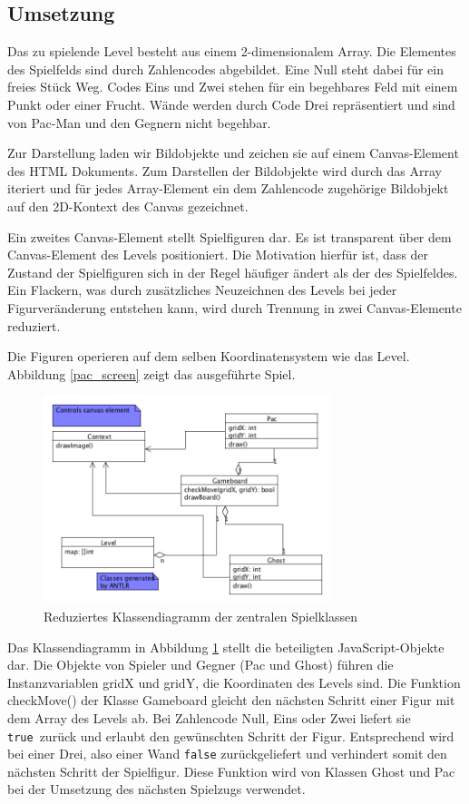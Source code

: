 \documentclass[conference]{IEEEtran}
\begin{document}
\subsection{Umsetzung}
\label{umsetz}
Das zu spielende Level besteht aus einem 2-dimensionalem Array. Die Elementes des Spielfelds sind durch Zahlencodes abgebildet. Eine Null steht dabei für ein freies Stück Weg. Codes Eins und Zwei stehen für ein begehbares Feld mit einem Punkt oder einer Frucht. Wände werden durch Code Drei repräsentiert und sind von Pac-Man und den Gegnern nicht begehbar.

Zur Darstellung laden wir Bildobjekte und zeichen sie auf einem Canvas-Element des HTML Dokuments. Zum Darstellen der Bildobjekte wird durch das Array iteriert und für jedes Array-Element ein dem Zahlencode zugehörige Bildobjekt auf den 2D-Kontext des Canvas gezeichnet.

Ein zweites Canvas-Element stellt Spielfiguren dar. Es ist transparent über dem Canvas-Element des Levels positioniert. Die Motivation hierfür ist, dass der Zustand der Spielfiguren sich in der Regel häufiger ändert als der des Spielfeldes. Ein Flackern, was durch zusätzliches Neuzeichnen des Levels bei jeder Figurveränderung entstehen kann, wird durch Trennung in zwei Canvas-Elemente reduziert.

Die Figuren operieren auf dem selben Koordinatensystem wie das Level. Abbildung \ref{pac_screen} zeigt das ausgeführte Spiel.

\begin{figure}[!t]
\centering
\includegraphics[width=3.3in]{gameboard_and_figures.png}

\caption{Reduziertes Klassendiagramm der zentralen Spielklassen}
\label{main_classes}
\end{figure}

Das Klassendiagramm in Abbildung \ref{main_classes} stellt die beteiligten JavaScript-Objekte dar. Die Objekte von Spieler und Gegner (Pac und Ghost) führen die Instanzvariablen gridX und gridY, die Koordinaten des Levels sind. Die Funktion checkMove() der Klasse Gameboard gleicht den nächsten Schritt einer Figur mit dem Array des Levels ab. Bei Zahlencode Null, Eins oder Zwei liefert sie \texttt{true} zurück und erlaubt den gewünschten Schritt der Figur. Entsprechend wird bei einer Drei, also einer Wand \texttt{false} zurückgeliefert und verhindert somit den nächsten Schritt der Spielfigur. Diese Funktion wird von Klassen Ghost und Pac bei der Umsetzung des nächsten Spielzugs verwendet.
\end{document}

